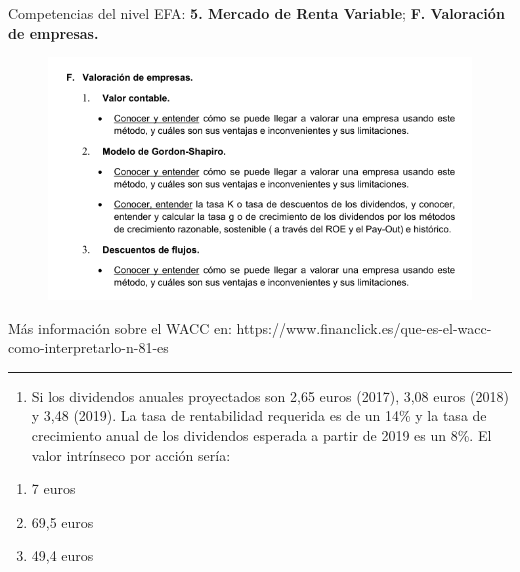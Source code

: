 \documentclass[
  letterpaper,
  DIV=11,
  numbers=noendperiod]{scrreprt}
\providecommand{\tightlist}{%
  \setlength{\itemsep}{0pt}\setlength{\parskip}{0pt}}\usepackage{longtable,booktabs,array}
\begin{document}
\begin{tcolorbox}[enhanced jigsaw, left=2mm, opacityback=0, colback=white, breakable, arc=.35mm, bottomrule=.15mm, rightrule=.15mm, toprule=.15mm, leftrule=.75mm, colframe=quarto-callout-tip-color-frame]
\begin{minipage}[t]{\textwidth - 5.5mm}
Competencias del nivel EFA: \textbf{5. Mercado de Renta Variable};
\textbf{F. Valoración de empresas.}

\begin{figure}[H]

{\centering \includegraphics[width=1\textwidth,height=\textheight]{./images/wacc.png}

}

\end{figure}

Más información sobre el WACC en:
https://www.financlick.es/que-es-el-wacc-como-interpretarlo-n-81-es

\end{minipage}%
\end{tcolorbox}

\begin{center}\rule{0.5\linewidth}{0.5pt}\end{center}

\begin{enumerate}
\def\labelenumi{\arabic{enumi}.}
\setcounter{enumi}{88}
\tightlist
\item
  Si los dividendos anuales proyectados son 2,65 euros (2017), 3,08
  euros (2018) y 3,48 (2019). La tasa de rentabilidad requerida es de un
  14\% y la tasa de crecimiento anual de los dividendos esperada a
  partir de 2019 es un 8\%. El valor intrínseco por acción sería:
\end{enumerate}

\begin{enumerate}
\def\labelenumi{\alph{enumi})}
\item
  7 euros
\item
  69,5 euros
\item
  49,4 euros
\end{enumerate}
\end{document}
